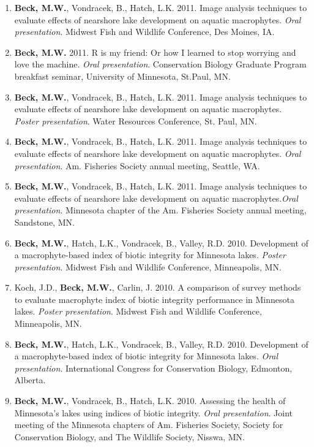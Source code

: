 \documentclass[letterpaper,12pt]{article}
\begin{document}
\begin{enumerate}
\item {\bf Beck, M.W.}, Vondracek, B., Hatch, L.K. 2011. Image analysis techniques to evaluate effects of nearshore lake development on aquatic macrophytes. \textit{Oral presentation}. Midwest Fish and Wildlife Conference, Des Moines, IA.

\item {\bf Beck, M.W.} 2011. R is my friend: Or how I learned to stop worrying and love the machine. \textit{Oral presentation}. Conservation Biology Graduate Program breakfast seminar, University of Minnesota, St.Paul, MN.

\item {\bf Beck, M.W.}, Vondracek, B., Hatch, L.K. 2011. Image analysis techniques to evaluate effects of nearshore lake development on aquatic macrophytes. \textit{Poster presentation}. Water Resources Conference, St. Paul, MN.

\item {\bf Beck, M.W.}, Vondracek, B., Hatch, L.K. 2011. Image analysis techniques to evaluate effects of nearshore lake development on aquatic macrophytes. \textit{Oral presentation}. Am. Fisheries Society annual meeting, Seattle, WA.

\item {\bf Beck, M.W.}, Vondracek, B., Hatch, L.K. 2011. Image analysis techniques to evaluate effects of nearshore lake development on aquatic macrophytes.\textit{Oral presentation}. Minnesota chapter of the Am. Fisheries Society annual meeting, Sandstone, MN.

\item {\bf Beck, M.W.}, Hatch, L.K., Vondracek, B., Valley, R.D. 2010. Development of a macrophyte-based index of biotic integrity for Minnesota lakes. \textit{Poster presentation}. Midwest Fish and Wildlife Conference, Minneapolis, MN.

\item Koch, J.D., {\bf Beck, M.W.}, Carlin, J. 2010. A comparison of survey methods to evaluate macrophyte index of biotic integrity performance in Minnesota lakes. \textit{Poster presentation}. Midwest Fish and Wildlife Conference, Minneapolis, MN.

\item {\bf Beck, M.W.}, Hatch, L.K., Vondracek, B., Valley, R.D. 2010. Development of a macrophyte-based index of biotic integrity for Minnesota lakes. \textit{Oral presentation}. International Congress for Conservation Biology, Edmonton, Alberta.

\item {\bf Beck, M.W.}, Vondracek, B., Hatch, L.K. 2010. Assessing the health of Minnesota's lakes using indices of biotic integrity. \textit{Oral presentation}. Joint meeting of the Minnesota chapters of Am. Fisheries Society, Society for Conservation Biology, and The Wildlife Society, Nisswa, MN.


\end{enumerate}
\end{document}

